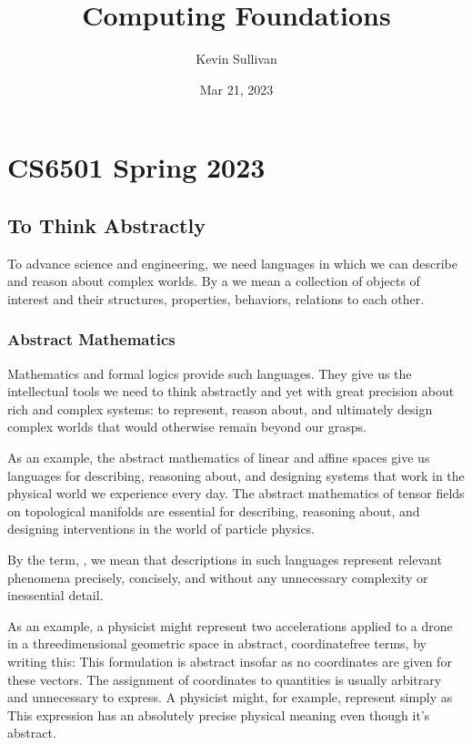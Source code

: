 \documentclass[letterpaper,10pt,english]{sphinxmanual}
\title{Computing Foundations}
\date{Mar 21, 2023}
\author{Kevin Sullivan}
\begin{document}
\pagestyle{empty}
\sphinxmaketitle
\pagestyle{plain}
\sphinxtableofcontents
\pagestyle{normal}
\label{\detokenize{index::doc}}


\sphinxstepscope


\chapter{CS6501 Spring 2023}
\label{\detokenize{A_00_Introduction:cs6501-spring-2023}}\label{\detokenize{A_00_Introduction:introduction}}\label{\detokenize{A_00_Introduction::doc}}

\section{To Think Abstractly}
\label{\detokenize{A_00_Introduction:to-think-abstractly}}
\sphinxAtStartPar
To advance science and engineering, we need languages in
which we can describe and reason about complex worlds. By
a  we mean a collection of objects of interest and
their structures, properties, behaviors, relations to each
other.


\subsection{Abstract Mathematics}
\label{\detokenize{A_00_Introduction:abstract-mathematics}}
\sphinxAtStartPar
Mathematics and formal logics provide such languages. They
give us the intellectual tools we need to think abstractly
and yet with great precision about rich and complex systems:
to represent, reason about, and ultimately design complex
worlds that would otherwise remain beyond our grasps.

\sphinxAtStartPar
As an example, the abstract mathematics of linear and affine
spaces give us languages for describing, reasoning about, and
designing systems that work in the  physical world
we experience every day. The abstract mathematics of tensor
fields on topological manifolds are essential for describing,
reasoning about, and designing interventions in the 
world of particle physics.

\sphinxAtStartPar
By the term, , we mean that descriptions in such
languages represent relevant phenomena precisely, concisely,
and without any unnecessary complexity or inessential detail.

\sphinxAtStartPar
As an example, a physicist might represent two accelerations
applied to a drone in a three\sphinxhyphen{}dimensional geometric space in
abstract, coordinate\sphinxhyphen{}free terms, by writing this:  This formulation is abstract
insofar as no coordinates are given for these vectors. The
assignment of coordinates to  quantities is usually
arbitrary and unnecessary to express. A physicist might, for
example, represent  simply as
 This expression has an absolutely precise physical
meaning even though it’s abstract.
\end{document}
